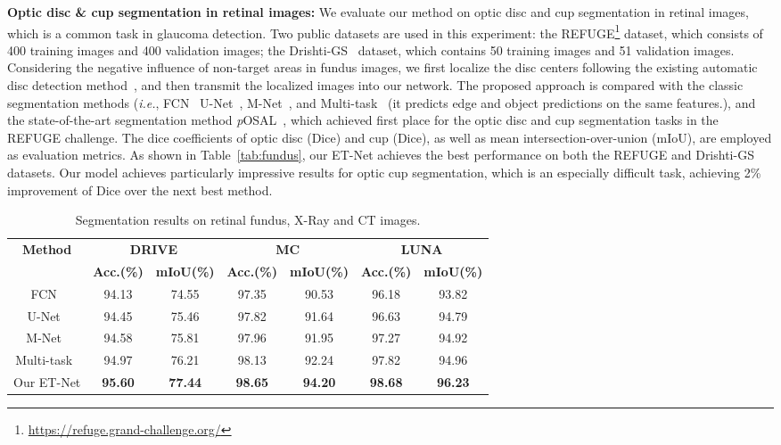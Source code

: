\documentclass[runningheads,a4paper]{llncs}
\newcommand{\ie}{{\it i.e.}}
\begin{document}
\noindent\textbf{Optic disc \& cup segmentation in retinal images:} We evaluate our method on optic disc and cup segmentation in retinal images, which is a common task in glaucoma detection. Two public datasets are used in this experiment: the REFUGE\footnote{\href{https://refuge.grand-challenge.org/}{https://refuge.grand-challenge.org/}} dataset, which consists of 400 training images and 400 validation images; the Drishti-GS~\cite{Drishti} dataset, which contains 50 training images and 51 validation images. Considering the negative influence of non-target areas in fundus images, we first localize the disc centers following the existing automatic disc detection method~\cite{mnet2018fu}, and then transmit the localized images into our network.
The proposed approach is compared with the classic segmentation methods (\ie, FCN~\cite{fcn} U-Net~\cite{Ronneberger2015}, M-Net~\cite{mnet2018fu}, and Multi-task~\cite{multitask} (it predicts edge and object predictions on the same features.), and the state-of-the-art segmentation method \textit{p}OSAL~\cite{Wang2019tmi}, which achieved first place for the optic disc and cup segmentation tasks in the REFUGE challenge. The dice coefficients of optic disc (Dice) and cup (Dice), as well as mean intersection-over-union (mIoU), are employed as evaluation metrics.
As shown in Table~\ref{tab:fundus}, our ET-Net achieves the best performance on both the REFUGE and Drishti-GS datasets. Our model achieves particularly impressive results for optic cup segmentation, which is an especially difficult task, achieving 2\% improvement of Dice over the next best method.

\begin{table}[!t]
	\footnotesize
	\begin{center}
		\caption{Segmentation results on retinal fundus, X-Ray and CT images.}
		\begin{tabular}{c|c|c|c|c|c|c}
			\hline
			\textbf{Method}  &    \multicolumn{2}{c|}{\textbf{DRIVE}}&    \multicolumn{2}{c|}{\textbf{MC}}    &   \multicolumn{2}{c}{\textbf{LUNA}}    \\ \cline{2-7}
			                & \textbf{ Acc.(\%)} & \textbf{mIoU(\%)} & \textbf{Acc.(\%)} & \textbf{mIoU(\%)}& \textbf{Acc.(\%)} & \textbf{mIoU(\%)} \\ \hline
			     FCN~\cite{fcn}     & 94.13 & 74.55 & 97.35  & 90.53 & 96.18 & 93.82 \\
			     U-Net~\cite{Ronneberger2015}     & 94.45 & 75.46 & 97.82 & 91.64 & 96.63 & 94.79 \\
			     M-Net~\cite{mnet2018fu}  & 94.58 & 75.81 & 97.96 & 91.95 & 97.27 & 94.92 \\
			     Multi-task~\cite{multitask}     & 94.97 & 76.21 & 98.13 & 92.24 & 97.82 & 94.96 \\ \hline
			  Our ET-Net   & \textbf{95.60} & \textbf{77.44} &  \textbf{98.65} & \textbf{94.20} & \textbf{98.68}   & \textbf{96.23} \\ \hline
		\end{tabular}
		\label{tab:lung}
	\end{center}
\end{table}
\end{document}
